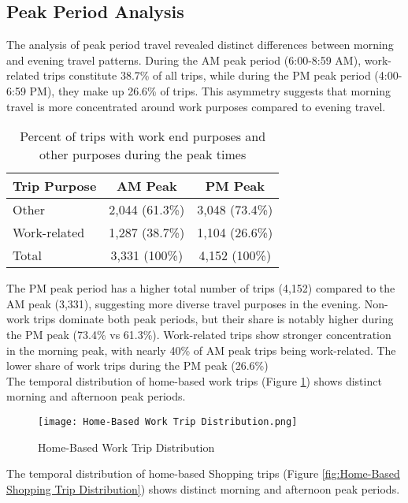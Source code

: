\subsection{Peak Period Analysis}

The analysis of peak period travel revealed distinct differences between morning and evening travel patterns. During the AM peak period (6:00-8:59 AM), work-related trips constitute 38.7\% of all trips, while during the PM peak period (4:00-6:59 PM), they make up 26.6\% of trips. This asymmetry suggests that morning travel is more concentrated around work purposes compared to evening travel.


\begin{table}[h]
\centering
\caption{Percent of trips with work end purposes and other purposes during the peak times}
\begin{tabular}{lcc}
\toprule
Trip Purpose & AM Peak & PM Peak \\
\midrule
Other & 2,044 (61.3\%) & 3,048 (73.4\%) \\
Work-related & 1,287 (38.7\%) & 1,104 (26.6\%) \\
\midrule
Total & 3,331 (100\%) & 4,152 (100\%) \\
\bottomrule
\end{tabular}
\label{tab:peak_trips}
\end{table}

The PM peak period has a higher total number of trips (4,152) compared to the AM peak (3,331), suggesting more diverse travel purposes in the evening. Non-work trips dominate both peak periods, but their share is notably higher during the PM peak (73.4\% vs 61.3\%). Work-related trips show stronger concentration in the morning peak, with nearly 40\% of AM peak trips being work-related. The lower share of work trips during the PM peak (26.6\%)\\


The temporal distribution of home-based work trips (Figure \ref{fig:Home-Based Work Trip Distribution}) shows distinct morning and afternoon peak periods. 

\begin{figure}[h!]
    \centering
    \texttt{[image: Home-Based Work Trip Distribution.png]}
    \caption{Home-Based Work Trip Distribution}
    \label{fig:Home-Based Work Trip Distribution}
\end{figure}


The temporal distribution of home-based Shopping trips (Figure \ref{fig:Home-Based Shopping Trip Distribution}) shows distinct morning and afternoon peak periods. 

